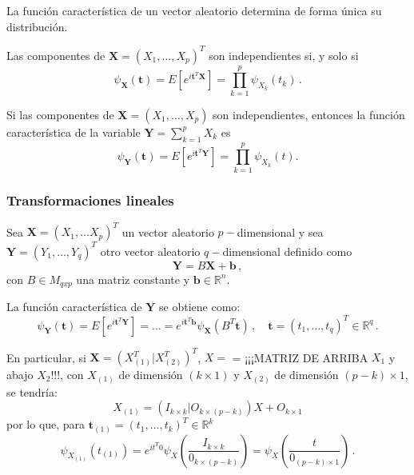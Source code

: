 \begin{nth}[Unicidad]
  La función característica de un vector aleatorio determina de forma única su distribución.
\end{nth}

\begin{nprop}
  Las componentes de \(\boldsymbol X=(X_1,\dots,X_p)^T\) son independientes si, y solo si \[\psi_{\boldsymbol X}(\boldsymbol t)=E\left[e^{i\boldsymbol t^T\boldsymbol X}\right] = \prod_{k=1}^p\psi_{X_k}(t_k)\,.\]
\end{nprop}

\begin{nprop}
  Si las componentes de \(\boldsymbol X=(X_1,\dots, X_p)\) son independientes, entonces la función característica de la variable \(\boldsymbol Y=\sum_{k=1}^p X_k\) es \[\psi_{\boldsymbol Y}(\boldsymbol t)=E\left[e^{i\boldsymbol t^T\boldsymbol Y}\right] = \prod_{k=1}^p\psi_{X_k}(t).\]
\end{nprop}

\subsubsection{Transformaciones lineales}

Sea $\boldsymbol X = (X_1, \dots X_p)^T$ un vector aleatorio $p-$dimensional y sea $\boldsymbol Y = (Y_1,\dots,Y_q)^T$ otro vector aleatorio $q-$dimensional definido como
\[
  \boldsymbol Y = B\boldsymbol X + \boldsymbol b\,,
\]
con $B \in M_{qxp}$ una matriz constante y $\boldsymbol b\in \mathbb R ^n$.

\begin{nprop}
  La función característica de $\boldsymbol Y$ se obtiene como:
  \[
  \psi_{\boldsymbol Y}(\boldsymbol t) = E\left[e^{i\boldsymbol t^T \boldsymbol Y}\right] = \dots = e^{i\boldsymbol t^T \boldsymbol b} \psi_{\boldsymbol X}(B^T \boldsymbol t)\,, \quad \boldsymbol t = (t_1,\dots,t_q)^T \in \mathbb R^q\,.
  \]
\end{nprop}
  En particular, si $\boldsymbol X= \left( X_{(1)}^T | X_{(2)}^T\right)^T$, $X=$ = ¡¡¡MATRIZ DE ARRIBA $X_1$ y abajo $X_2$!!!, con $X_{(1)}$ de dimensión $(k\times1)$ y $X_{(2)}$ de dimensión $(p-k) \times 1$, se tendría:
  \[
X_{(1)} = ( I_{k\times k} | O_{k \times(p-k)})X + O_{k\times 1}
\]
por lo que, para $\boldsymbol t_{(1)} = (t_1,\dots,t_k)^T \in \mathbb R^k$
\[
\psi_{X_{(1)}}\left(t_{(1)}\right) = e^{it^T 0} \psi_X\left(\frac{I_{k\times k}}{0_{k\times(p-k)}}\right) = \psi_X\left(\frac{t}{0_{(p-k)\times1}}\right)\,.
\]

